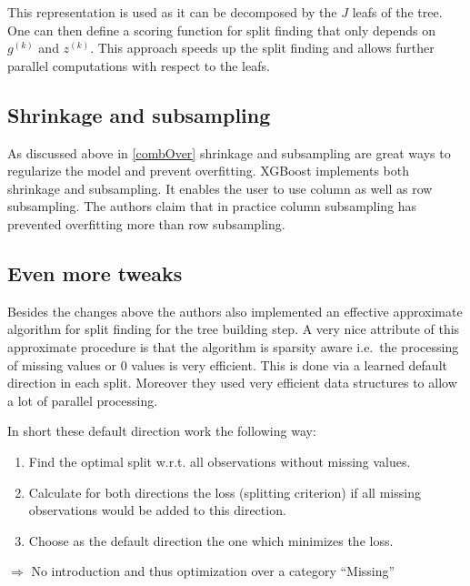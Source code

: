 \documentclass[
]{book}
\begin{document}
This representation is used as it can be decomposed by the \(J\) leafs of the tree. One can then define a scoring function for split finding that only depends on \(g^{(k)}\) and \(z^{(k)}\). This approach speeds up the split finding and allows further parallel computations with respect to the leafs.

\hypertarget{shrinkage-and-subsampling}{%
\subsection{Shrinkage and subsampling}\label{shrinkage-and-subsampling}}

As discussed above in \ref{combOver} shrinkage and subsampling are great ways to regularize the model and prevent overfitting. XGBoost implements both shrinkage and subsampling. It enables the user to use column as well as row subsampling. The authors claim that in practice column subsampling has prevented overfitting more than row subsampling.\citep{xgboostPaper}

\hypertarget{even-more-tweaks}{%
\subsection{Even more tweaks}\label{even-more-tweaks}}

Besides the changes above the authors also implemented an effective approximate algorithm for split finding for the tree building step. A very nice attribute of this approximate procedure is that the algorithm is sparsity aware i.e.~the processing of missing values or 0 values is very efficient. This is done via a learned default direction in each split. Moreover they used very efficient data structures to allow a lot of parallel processing.\citep{xgboostPaper}

In short these default direction work the following way:

\begin{enumerate}
\def\labelenumi{\arabic{enumi}.}
\item
  Find the optimal split w.r.t. all observations without missing values.
\item
  Calculate for both directions the loss (splitting criterion) if all missing observations would be added to this direction.
\item
  Choose as the default direction the one which minimizes the loss.
\end{enumerate}

\(\Rightarrow\) No introduction and thus optimization over a category ``Missing''
\end{document}
